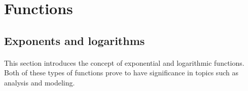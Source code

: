 \documentclass[12pt, a4paper, titlepage, twoside]{article}
\newcommand*{\Z}{\mathbb{Z}}
\newcommand*{\Q}{\mathbb{Q}}
\begin{document}
%	
%	
%	
%	
%	
%	
%	
%	
	
	
	\newpage
	
\section{Functions}
	
	\subsection{Exponents and logarithms}

	\paragraph{}
	This section introduces the concept of exponential and logarithmic functions. Both of these types of functions prove to have
	significance in topics such as analysis and modeling.
	
\end{document}
